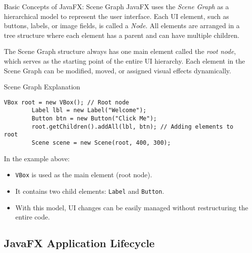 \documentclass[aspectratio=169, table]{beamer}
\begin{document}
\begin{frame}[fragile]{Basic Concepts of JavaFX: Scene Graph}
	\vspace{20pt}
	JavaFX uses the \textit{Scene Graph} as a hierarchical model to represent the user interface.  
	Each UI element, such as buttons, labels, or image fields, is called a \textit{Node}.  
	All elements are arranged in a tree structure where each element has a parent  
	and can have multiple children.
	
	\bigskip
	The Scene Graph structure always has one main element called the \textit{root node},  
	which serves as the starting point of the entire UI hierarchy.  
	Each element in the Scene Graph can be modified, moved, or assigned visual effects dynamically.

\end{frame}


\begin{frame}[fragile]{Scene Graph Explanation}
	\vspace{20pt}	
	\begin{lstlisting}[style=JavaStyle]
		VBox root = new VBox(); // Root node
		Label lbl = new Label("Welcome");
		Button btn = new Button("Click Me");
		root.getChildren().addAll(lbl, btn); // Adding elements to root
		Scene scene = new Scene(root, 400, 300);
	\end{lstlisting}
	In the example above:
	\begin{itemize}
		\item \texttt{VBox} is used as the main element (root node).
		\item It contains two child elements: \texttt{Label} and \texttt{Button}.
		\item With this model, UI changes can be easily managed without restructuring the entire code.
	\end{itemize}
\end{frame}

\subsection{JavaFX Application Lifecycle}
\end{document}
